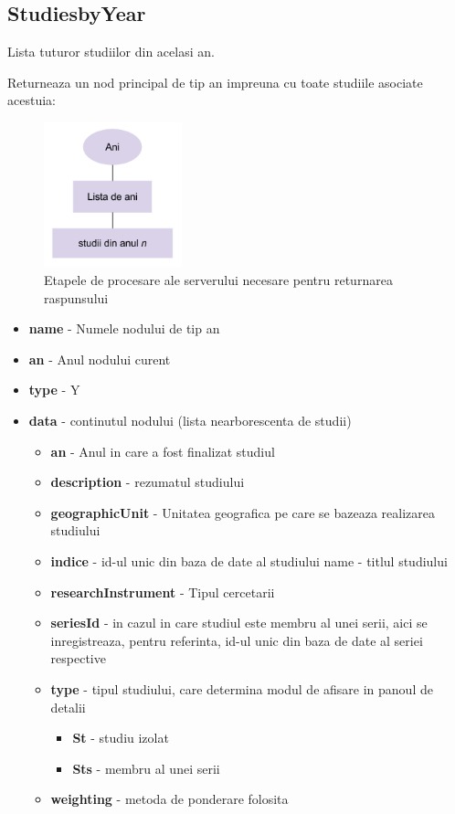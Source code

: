 \subsection{StudiesbyYear}

Lista tuturor studiilor din acelasi an.

Returneaza un nod principal de tip an impreuna cu toate studiile asociate
acestuia:

\begin{figure}[H]
\begin{centering}
\includegraphics[width=4cm]{img/studiesbyyear}
\par\end{centering}
\caption{Etapele de procesare ale serverului necesare pentru returnarea raspunsului}
\end{figure}

\begin{itemize}
\item \textbf{name} - Numele nodului de tip an 
\item \textbf{an} - Anul nodului curent 
\item \textbf{type} - Y 
\item \textbf{data} - continutul nodului (lista nearborescenta de studii) 

\begin{itemize}
\item \textbf{an} - Anul in care a fost finalizat studiul 
\item \textbf{description} - rezumatul studiului 
\item \textbf{geographicUnit} - Unitatea geografica pe care se bazeaza realizarea
studiului 
\item \textbf{indice} - id-ul unic din baza de date al studiului name -
titlul studiului 
\item \textbf{researchInstrument} - Tipul cercetarii 
\item \textbf{seriesId} - in cazul in care studiul este membru al unei serii,
aici se inregistreaza, pentru referinta, id-ul unic din baza de date
al seriei respective 
\item \textbf{type} - tipul studiului, care determina modul de afisare in
panoul de detalii 

\begin{itemize}
\item \textbf{St} - studiu izolat 
\item \textbf{Sts} - membru al unei serii 
\end{itemize}
\item \textbf{weighting} - metoda de ponderare folosita
\end{itemize}
\end{itemize}

